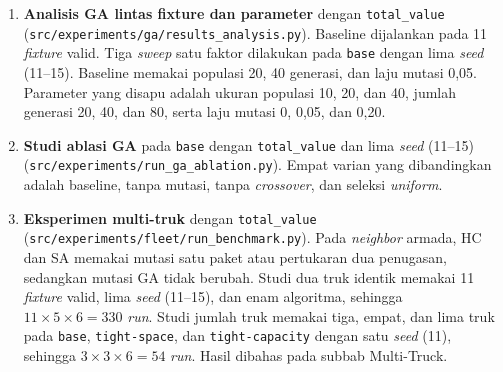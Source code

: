 \begin{enumerate}
    \item \textbf{Analisis GA lintas fixture dan parameter} dengan \texttt{total\_value} (\texttt{src/\allowbreak experiments/\allowbreak ga/\allowbreak results\_analysis.py}). Baseline dijalankan pada 11 \textit{fixture} valid. Tiga \textit{sweep} satu faktor dilakukan pada \texttt{base} dengan lima \textit{seed} (11--15). Baseline memakai populasi 20, 40 generasi, dan laju mutasi 0,05. Parameter yang disapu adalah ukuran populasi 10, 20, dan 40, jumlah generasi 20, 40, dan 80, serta laju mutasi 0, 0,05, dan 0,20.
    \item \textbf{Studi ablasi GA} pada \texttt{base} dengan \texttt{total\_value} dan lima \textit{seed} (11--15) (\texttt{src/\allowbreak experiments/\allowbreak run\_ga\_ablation.py}). Empat varian yang dibandingkan adalah baseline, tanpa mutasi, tanpa \textit{crossover}, dan seleksi \textit{uniform}.
    \item \textbf{Eksperimen multi-truk} dengan \texttt{total\_value} (\texttt{src/\allowbreak experiments/\allowbreak fleet/\allowbreak run\_benchmark.py}). Pada \textit{neighbor} armada, HC dan SA memakai mutasi satu paket atau pertukaran dua penugasan, sedangkan mutasi GA tidak berubah. Studi dua truk identik memakai 11 \textit{fixture} valid, lima \textit{seed} (11--15), dan enam algoritma, sehingga $11 \times 5 \times 6 = 330$ \textit{run}. Studi jumlah truk memakai tiga, empat, dan lima truk pada \texttt{base}, \texttt{tight-space}, dan \texttt{tight-capacity} dengan satu \textit{seed} (11), sehingga $3 \times 3 \times 6 = 54$ \textit{run}. Hasil dibahas pada subbab Multi-Truck.
\end{enumerate}

